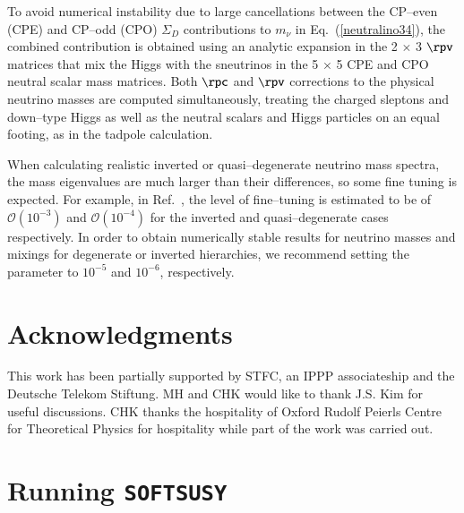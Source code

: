 \documentclass[pdflatex,final,3p,times]{elsarticle}
\def\SOFTSUSY{{\tt SOFTSUSY}}
\begin{document}
To avoid numerical instability due to large cancellations between the
CP--even (CPE) and CP--odd (CPO) $\Sigma_D$ contributions to $m_{\nu}$
in Eq.~(\ref{neutralino34}), the combined contribution is obtained
using an analytic expansion in the 2 $\times$ 3 $\rpv$ matrices that
mix the Higgs with the sneutrinos in the 5 $\times$ 5 CPE and CPO
neutral scalar mass matrices. 
Both $\rpc$ and $\rpv$ corrections to the physical neutrino masses are
computed simultaneously, treating the charged sleptons and down--type Higgs as well
as the neutral scalars and Higgs particles on an equal footing, as in the
tadpole calculation. 

When calculating realistic inverted or quasi--degenerate neutrino mass
spectra, the mass eigenvalues are much larger than their differences,
so some fine tuning is expected.  For example, in
Ref.~\cite{Dreiner:2011ft}, the level of fine--tuning is estimated to
be of $\mathcal{O}(10^{-3})$ and $\mathcal{O}(10^{-4})$ for the
inverted and quasi--degenerate cases respectively.  In order to obtain
numerically stable results for neutrino masses and mixings for degenerate or
inverted hierarchies, we recommend setting the 
parameter to $10^{-5}$ and $10^{-6}$, respectively.


\section*{Acknowledgments}
This work has been partially supported by STFC, an IPPP associateship
and the Deutsche Telekom Stiftung. MH and CHK would like to thank
J.S. Kim for useful discussions.  CHK thanks the hospitality of Oxford
Rudolf Peierls Centre for Theoretical Physics for hospitality while
part of the work was carried out.

\appendix

\section{Running \SOFTSUSY}
\label{sec:run}
\end{document}
